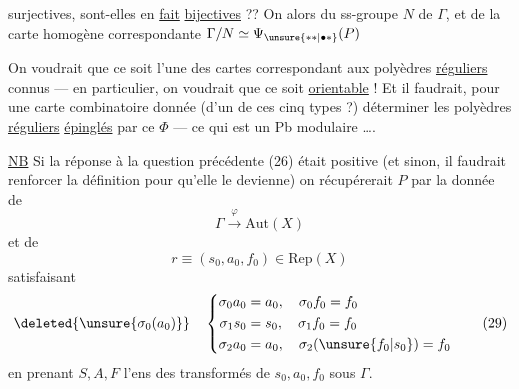 surjectives, sont-elles en \uline{fait} \uline{bijectives} ?? On  alors du ss-groupe  $N$ de $\Gamma$,  et de la carte homogène correspondante $\Gamma/N\simeq\Psi_{\unsure{**|\bullet *}}(P)$

On voudrait que ce soit l'une des  cartes correspondant aux polyèdres \uline{réguliers} connus --- en particulier, on voudrait que ce soit \uline{orientable} ! Et il faudrait, pour une carte combinatoire donnée (d'un de ces cinq types ?) déterminer les polyèdres \uline{réguliers} \uline{épinglés} par ce $\Phi$ --- ce qui est un Pb modulaire \ldots.

\uline{NB} Si la réponse à la question précédente (26) était positive (et sinon, il faudrait renforcer la définition pour qu'elle le devienne) on récupérerait $P$ par la donnée de
\[
 \Gamma\xrightarrow{\varphi}\mathrm{Aut}(X)\tag*{(27)}
\]
et de
\[
 r\equiv(s_0,a_0,f_0)\in\mathrm{Rep}(X)\tag*{(28)}
\]
satisfaisant
\[
 \deleted{\unsure{\sigma_0(a_0)}}\quad
 \left\{\begin{aligned}
 \sigma_0a_0&=a_0,\quad\sigma_0f_0=f_0\\
 \sigma_1s_0&=s_0,\quad\sigma_1f_0=f_0\\
 \sigma_2a_0&=a_0,\quad\sigma_2(\unsure{f_0|s_0})=f_0
 \end{aligned}\right.\tag*{(29)}
\]
en prenant  $S,A,F$ l'ens des transformés de $s_0,a_0,f_0$ sous $\Gamma$.
